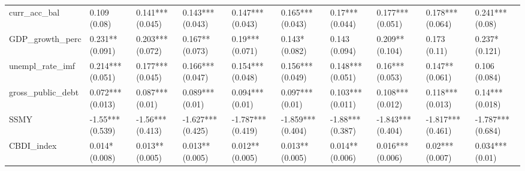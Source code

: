 \begin{table}[ht]
\begin{tabular}{llllllllll}
  curr\_acc\_bal & 0.109 (0.08) & 0.141*** (0.045) & 0.143*** (0.043) & 0.147*** (0.043) & 0.165*** (0.043) & 0.17*** (0.044) & 0.177*** (0.051) & 0.178*** (0.064) & 0.241*** (0.08) \\ 
  GDP\_growth\_perc & 0.231** (0.091) & 0.203*** (0.072) & 0.167** (0.073) & 0.19*** (0.071) & 0.143* (0.082) & 0.143 (0.094) & 0.209** (0.104) & 0.173 (0.11) & 0.237* (0.121) \\ 
  unempl\_rate\_imf & 0.214*** (0.051) & 0.177*** (0.045) & 0.166*** (0.047) & 0.154*** (0.048) & 0.156*** (0.049) & 0.148*** (0.051) & 0.16*** (0.053) & 0.147** (0.061) & 0.106 (0.084) \\ 
  gross\_public\_debt & 0.072*** (0.013) & 0.087*** (0.01) & 0.089*** (0.01) & 0.094*** (0.01) & 0.097*** (0.01) & 0.103*** (0.011) & 0.108*** (0.012) & 0.118*** (0.013) & 0.14*** (0.018) \\ 
  SSMY & -1.55*** (0.539) & -1.56*** (0.413) & -1.627*** (0.425) & -1.787*** (0.419) & -1.859*** (0.404) & -1.88*** (0.387) & -1.843*** (0.404) & -1.817*** (0.461) & -1.787*** (0.684) \\ 
  CBDI\_index & 0.014* (0.008) & 0.013** (0.005) & 0.013** (0.005) & 0.012** (0.005) & 0.013** (0.005) & 0.014** (0.006) & 0.016*** (0.006) & 0.02*** (0.007) & 0.034*** (0.01) \\ 
   \bottomrule
\end{tabular}
\endgroup
\end{table}
